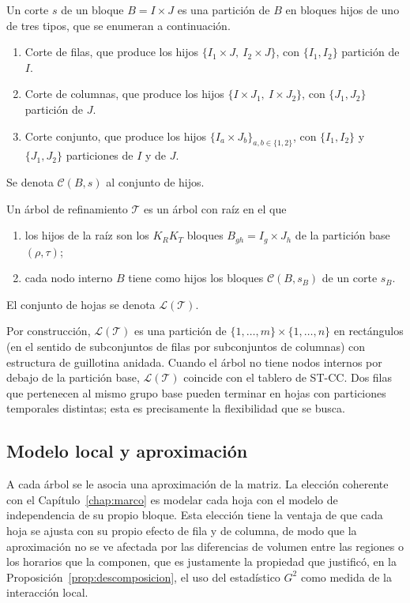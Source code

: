 \begin{definicion}\label{def:corte}
Un corte $s$ de un bloque $B = I\times J$ es una partición de $B$ en
bloques hijos de uno de tres tipos, que se enumeran a continuación.
\begin{enumerate}
  \item Corte de filas, que produce los hijos $\{I_1\times J,\ I_2\times J\}$, con
  $\{I_1,I_2\}$ partición de $I$.
  \item Corte de columnas, que produce los hijos $\{I\times J_1,\ I\times J_2\}$, con
  $\{J_1,J_2\}$ partición de $J$.
  \item Corte conjunto, que produce los hijos $\{I_a\times J_b\}_{a,b\in\{1,2\}}$, con
  $\{I_1,I_2\}$ y $\{J_1,J_2\}$ particiones de $I$ y de $J$.
\end{enumerate}
Se denota $\mathcal{C}(B,s)$ al conjunto de hijos.
\end{definicion}

\begin{definicion}\label{def:arbol}
Un árbol de refinamiento $\mathcal{T}$ es un árbol con raíz en el que
\begin{enumerate}
  \item los hijos de la raíz son los $K_R K_T$ bloques
  $B_{gh} = I_g\times J_h$ de la partición base $(\rho,\tau)$;
  \item cada nodo interno $B$ tiene como hijos los bloques
  $\mathcal{C}(B,s_B)$ de un corte $s_B$.
\end{enumerate}
El conjunto de hojas se denota $\mathcal{L}(\mathcal{T})$.
\end{definicion}

Por construcción, $\mathcal{L}(\mathcal{T})$ es una partición de
$\{1,\dots,m\}\times\{1,\dots,n\}$ en rectángulos (en el sentido de
subconjuntos de filas por subconjuntos de columnas) con estructura de
guillotina anidada. Cuando el árbol no tiene nodos internos por debajo de la
partición base, $\mathcal{L}(\mathcal{T})$ coincide con el tablero de ST-CC.
Dos filas que pertenecen al mismo grupo base pueden terminar en hojas con
particiones temporales distintas; esta es precisamente la flexibilidad que se
busca.

\subsection{Modelo local y aproximación}

A cada árbol se le asocia una aproximación de la matriz. La elección coherente
con el Capítulo~\ref{chap:marco} es modelar cada hoja con el modelo de
independencia de su propio bloque. Esta elección tiene la ventaja de que cada hoja
se ajusta con su propio efecto de fila y de columna, de modo que la aproximación
no se ve afectada por las diferencias de volumen entre las regiones o los
horarios que la componen, que es justamente la propiedad que justificó, en la
Proposición~\ref{prop:descomposicion}, el uso del estadístico $G^2$ como medida
de la interacción local.

